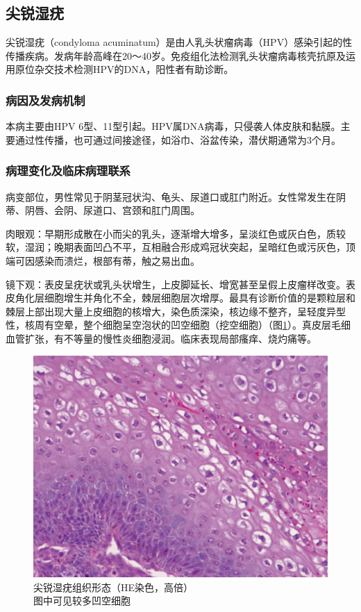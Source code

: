 \subsection{尖锐湿疣}

尖锐湿疣（condyloma
acuminatum）是由人乳头状瘤病毒（HPV）感染引起的性传播疾病。发病年龄高峰在20～40岁。免疫组化法检测乳头状瘤病毒核壳抗原及运用原位杂交技术检测HPV的DNA，阳性者有助诊断。

\subsubsection{病因及发病机制}

本病主要由HPV
6型、11型引起。HPV属DNA病毒，只侵袭人体皮肤和黏膜。主要通过性传播，也可通过间接途径，如浴巾、浴盆传染，潜伏期通常为3个月。

\subsubsection{病理变化及临床病理联系}

病变部位，男性常见于阴茎冠状沟、龟头、尿道口或肛门附近。女性常发生在阴蒂、阴唇、会阴、尿道口、宫颈和肛门周围。

肉眼观：早期形成散在小而尖的乳头，逐渐增大增多，呈淡红色或灰白色，质较软，湿润；晚期表面凹凸不平，互相融合形成鸡冠状突起，呈暗红色或污灰色，顶端可因感染而溃烂，根部有蒂，触之易出血。

镜下观：表皮呈疣状或乳头状增生，上皮脚延长、增宽甚至呈假上皮瘤样改变。表皮角化层细胞增生并角化不全，棘层细胞层次增厚。最具有诊断价值的是颗粒层和棘层上部出现大量上皮细胞的核增大，染色质深染，核边缘不整齐，呈轻度异型性，核周有空晕，整个细胞呈空泡状的凹空细胞（挖空细胞）（图\ref{fig14-15}）。真皮层毛细血管扩张，有不等量的慢性炎细胞浸润。临床表现局部瘙痒、烧灼痛等。

\begin{figure}[!htbp]
    \centering
    \includegraphics{./images/Image00240.jpg}
    \captionsetup{justification=centering}
    \caption{尖锐湿疣组织形态（HE染色，高倍）\\ {\small 图中可见较多凹空细胞}}
    \label{fig14-15}
\end{figure}


